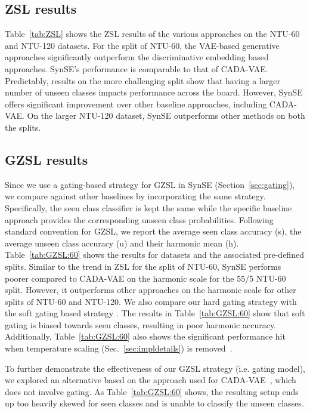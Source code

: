 \documentclass{article}
\begin{document}
\subsection{ZSL results}

Table~\ref{tab:ZSL} shows the ZSL results of the various approaches on the NTU-60 and NTU-120 datasets. For the  split of NTU-60, the VAE-based generative approaches significantly outperform the discriminative embedding based approaches. SynSE's performance is comparable to that of CADA-VAE. Predictably, results on the more challenging  split show that having a larger number of unseen classes impacts performance across the board. However, SynSE offers significant improvement over other baseline approaches, including CADA-VAE. On the larger NTU-120 dataset, SynSE outperforms other methods on both the splits. 

\subsection{GZSL results}

Since we use a gating-based strategy for GZSL in SynSE (Section~\ref{sec:gating}), we compare against other baselines by incorporating the same strategy. Specifically, the seen class classifier is kept the same while the specific baseline approach provides the corresponding unseen class probabilities. Following standard convention for GZSL, we report the average seen class accuracy (s), the average unseen class accuracy (u) and their harmonic mean (h). Table~\ref{tab:GZSL:60} shows the results for datasets and the associated pre-defined splits. Similar to the trend in ZSL for the  split of NTU-60, SynSE performs poorer compared to CADA-VAE on the harmonic scale for the 55/5 NTU-60 split. However, it outperforms other approaches on the harmonic scale for other splits of NTU-60 and NTU-120. We also compare our hard gating strategy \cite{socher2013zero} with the soft gating based strategy \cite{atzmon2019adaptive}. The results in Table~\ref{tab:GZSL:60} show that soft gating is biased towards seen classes, resulting in poor harmonic accuracy. Additionally, Table~\ref{tab:GZSL:60} also shows the significant performance hit when temperature scaling (Sec.~\ref{sec:impldetails}) is removed~\cite{hinton2015distilling}. 

To further demonstrate the effectiveness of our GZSL strategy (i.e. gating model), we explored an alternative based on the approach used for CADA-VAE~\cite{schonfeld2019generalized}, which does not involve gating. As Table~\ref{tab:GZSL:60} shows, the resulting setup ends up too heavily skewed for seen classes and is unable to classify the unseen classes.  
\end{document}
